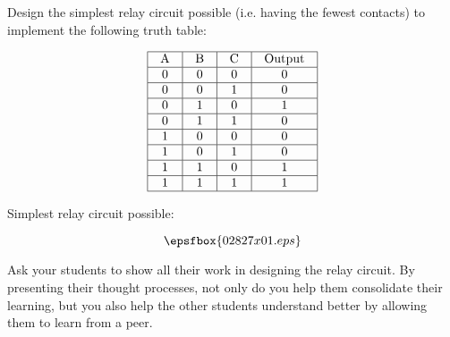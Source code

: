 

Design the simplest relay circuit possible (i.e. having the fewest contacts) to implement the following truth table:


$$\vbox{\offinterlineskip
\halign{\strut
\vrule \quad\hfil # \ \hfil & 
\vrule \quad\hfil # \ \hfil & 
\vrule \quad\hfil # \ \hfil & 
\vrule \quad\hfil # \ \hfil \vrule \cr
\noalign{\hrule}
%
A & B & C & Output \cr
%
\noalign{\hrule}
%
0 & 0 & 0 & 0 \cr
%
\noalign{\hrule}
%
0 & 0 & 1 & 0 \cr
%
\noalign{\hrule}
%
0 & 1 & 0 & 1 \cr
%
\noalign{\hrule}
%
0 & 1 & 1 & 0 \cr
%
\noalign{\hrule}
%
1 & 0 & 0 & 0 \cr
%
\noalign{\hrule}
%
1 & 0 & 1 & 0 \cr
%
\noalign{\hrule}
%
1 & 1 & 0 & 1 \cr
%
\noalign{\hrule}
%
1 & 1 & 1 & 1 \cr
%
\noalign{\hrule}
} %
}$$ %







Simplest relay circuit possible:

$$\epsfbox{02827x01.eps}$$







Ask your students to show all their work in designing the relay circuit.  By presenting their thought processes, not only do you help them consolidate their learning, but you also help the other students understand better by allowing them to learn from a peer.





